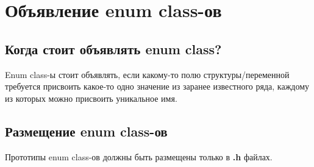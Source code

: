 \section{Объявление enum class-ов}\label{ec:h:0}
\subsection{Когда стоит объявлять enum class?}
Enum class-ы стоит объявлять, если какому-то полю структуры/переменной требуется присвоить какое-то одно значение из заранее известного ряда, каждому из которых можно присвоить уникальное имя.

\subsection{Размещение enum class-ов}
Прототипы enum class-ов должны быть размещены только в \textbf{.h} файлах.

